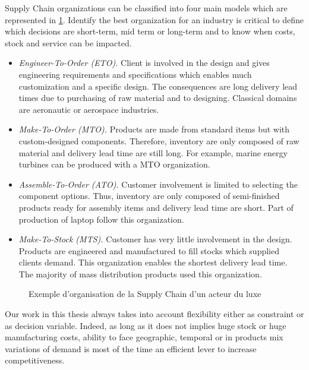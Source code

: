 Supply Chain organizations can be classified into four main models \cite{arnold2007} which are represented in \cref{fig:supply-chain-models}.
Identify the best organization for an industry is critical to define which decisions are short-term, mid term or long-term and to know when costs, stock and service can be impacted.
\begin{itemize}
  \item \emph{Engineer-To-Order (ETO).}
  Client is involved in the design and gives engineering requirements and specifications which enables much customization and a specific design.
  The consequences are long delivery lead times due to purchasing of raw material and to designing.
  Classical domains are aeronautic or aerospace industries.

  \item \emph{Make-To-Order (MTO).}
  Products are made from standard items but with custom-designed components.
  Therefore, inventory are only composed of raw material and delivery lead time are still long.
  For example, marine energy turbines can be produced with a MTO organization.

  \item \emph{Assemble-To-Order (ATO).}
  Customer involvement is limited to selecting the component options.
  Thus, inventory are only composed of semi-finished products ready for assembly items and delivery lead time are short.
  Part of production of laptop follow this organization.

  \item \emph{Make-To-Stock (MTS).}
  Customer has very little involvement in the design.
  Products are engineered and manufactured to fill stocks which supplied clients demand.
  This organization enables the shortest delivery lead time.
  The majority of mass distribution products used this organization.
\end{itemize}


\begin{figure}[h]
  \centering
  \caption{Exemple d'organisation de la Supply Chain d'un acteur du luxe}
  \label{fig:supply-chain-models}
\end{figure}




\medskip


Our work in this thesis always takes into account flexibility either as constraint or as decision variable.
Indeed, as long as it does not implies huge stock or huge manufacturing costs, ability to face geographic, temporal or in products mix variations of demand is most of the time an efficient lever to increase competitiveness.

